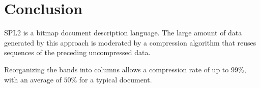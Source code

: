 \section{Conclusion}
SPL2 is a bitmap document description language.
The large amount of data generated by this approach is moderated by
a compression algorithm that reuses sequences of the preceding uncompressed
data.

Reorganizing the bands into columns allows a
compression rate of up to $99\%$, with an average of $50\%$ for a
typical document.

